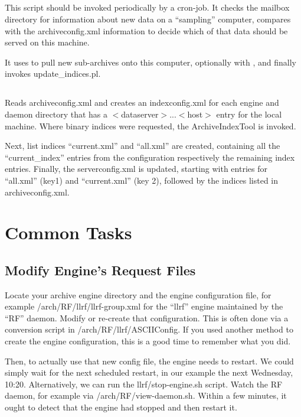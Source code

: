 \subsection{} \label{sec:updateServer}
This script should be invoked periodically by a cron-job.
It checks the mailbox directory for information about new data on a
``sampling'' computer, compares with the archiveconfig.xml information
to decide which of that data should be served on this machine.

It uses  to pull new sub-archives onto this computer,
optionally with , and finally invokes update\_indices.pl.

\subsection{} \label{sec:updateIndices}
Reads archiveconfig.xml and creates an indexconfig.xml for each
engine and daemon directory that has a $<$dataserver$>$...$<$host$>$
entry for the local machine.
Where binary indices were requested, the ArchiveIndexTool is invoked.

Next, list indices ``current.xml'' and ``all.xml'' are created, 
containing all the ``current\_index'' entries from the configuration
respectively the remaining index entries.
Finally, the serverconfig.xml is updated, starting with entries for
``all.xml'' (key1) and ``current.xml'' (key 2), followed by the
indices listed in archiveconfig.xml.

\section{Common Tasks}
\subsection{Modify Engine's Request Files}
Locate your archive engine directory and the engine configuration
file, for example /arch/RF/llrf/llrf-group.xml for the ``llrf'' engine
maintained by the ``RF'' daemon.  Modify or re-create that
configuration. This is often done via a conversion script in
/arch/RF/llrf/ASCIIConfig. If you used another method to create the
engine configuration, this is a good time to remember what you did.

Then, to actually use that new config file, the engine needs to
restart. We could simply wait for the next scheduled restart, in our
example the next Wednesday, 10:20. Alternatively, we can run the
llrf/stop-engine.sh script.
Watch the RF daemon, for example via /arch/RF/view-daemon.sh.
Within a few minutes, it ought to detect that the engine had stopped
and then restart it.

